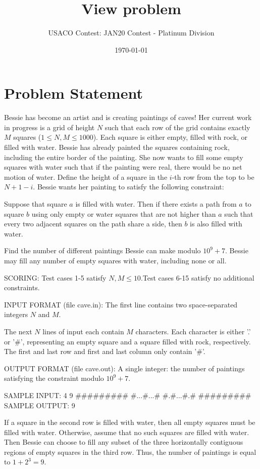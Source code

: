 \documentclass[12pt]{article}
\title{View problem}
\author{USACO Contest: JAN20 Contest - Platinum Division}
\date{\today}
\begin{document}
\maketitle

\section*{Problem Statement}

Bessie has become an artist and is creating paintings of caves! Her current work
in progress is a grid of height $N$ such that each row of the grid contains
exactly $M$ squares ($1\le N,M\le 1000$). Each square is either empty, filled
with rock, or filled with water. Bessie has already painted the squares
containing rock, including the entire border of the painting. She now wants to
fill some empty squares with water such that if the painting were real, there
would be no net motion of water. Define the height of a square in the $i$-th row
from the top to be $N+1-i$. Bessie wants her painting to satisfy the following
constraint: 

Suppose that square $a$ is filled with water. Then if there exists a path from
$a$ to square $b$ using only empty or water squares that are not higher than $a$
such that every two adjacent squares on the path share a side, then $b$ is also
filled with water. 

Find the number of different paintings Bessie can make modulo $10^9+7$.  Bessie
may fill any number of empty squares with water, including none or all. 

SCORING:
Test cases 1-5 satisfy $N,M\le 10.$Test cases 6-15 satisfy no
additional constraints.

INPUT FORMAT (file cave.in):
The first line contains two space-separated integers $N$ and $M$.

The next $N$ lines of input each contain $M$ characters. Each character is
either '.' or '#', representing an empty square and a square filled with rock,
respectively. The first and last row and first and last column only contain '#'.

OUTPUT FORMAT (file cave.out):
A single integer: the number of paintings satisfying the constraint modulo
$10^9+7$.

SAMPLE INPUT:
4 9
#########
#...#...#
#.#...#.#
#########
SAMPLE OUTPUT: 
9

If a square in the second row is filled with water, then all empty squares must
be filled with water. Otherwise, assume that no such squares are filled with
water. Then Bessie can choose to fill any subset of the three horizontally
contiguous regions of empty squares in the third row. Thus, the number of
paintings is equal to $1+2^3=9.$
\end{document}
